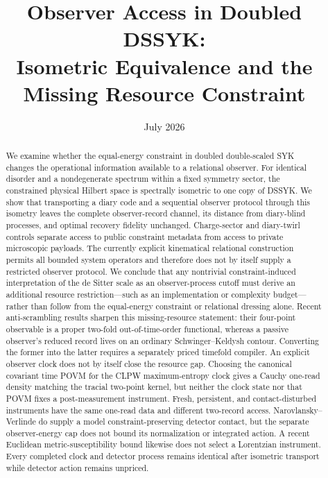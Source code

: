 \documentclass[11pt]{article}
\title{Observer Access in Doubled DSSYK:\\
Isometric Equivalence and the Missing Resource Constraint}
\author{}
\date{July 2026}
\begin{document}
\maketitle

\begin{abstract}
We examine whether the equal-energy constraint in doubled double-scaled SYK
changes the operational information available to a relational observer.  For
identical disorder and a nondegenerate spectrum within a fixed symmetry
sector, the constrained physical Hilbert space is spectrally isometric to one
copy of DSSYK.  We show that
transporting a diary code and a sequential observer protocol through this
isometry leaves the complete observer-record channel, its distance from
diary-blind processes, and optimal recovery fidelity unchanged.  Charge-sector
and diary-twirl controls separate access to public constraint metadata from
access to private microscopic payloads.  The currently explicit kinematical
relational construction permits all bounded system operators and therefore
does not by itself supply a restricted observer protocol.  We conclude that
any nontrivial constraint-induced interpretation of the de Sitter scale as an
observer-process cutoff must derive an additional resource restriction---such
as an implementation or complexity budget---rather than follow from the
equal-energy constraint or relational dressing alone.
Recent anti-scrambling results sharpen this missing-resource statement:
their four-point observable is a proper two-fold out-of-time-order functional,
whereas a passive observer's reduced record lives on an ordinary
Schwinger--Keldysh contour.  Converting the former into the latter requires a
separately priced timefold compiler.  An explicit observer clock does not by
itself close the resource gap.  Choosing the canonical covariant time POVM for
the CLPW maximum-entropy clock gives a Cauchy one-read density matching the
tracial two-point kernel, but neither the clock state nor that POVM fixes a
post-measurement instrument.  Fresh, persistent, and contact-disturbed
instruments have the same one-read data and different two-record access.
Narovlansky--Verlinde do supply a model constraint-preserving detector
contact, but the separate observer-energy cap does not bound its normalization
or integrated action.  A recent Euclidean metric-susceptibility bound likewise
does not select a Lorentzian instrument.  Every completed clock and detector
process remains identical after isometric transport while detector action
remains unpriced.
\end{abstract}
\end{document}
